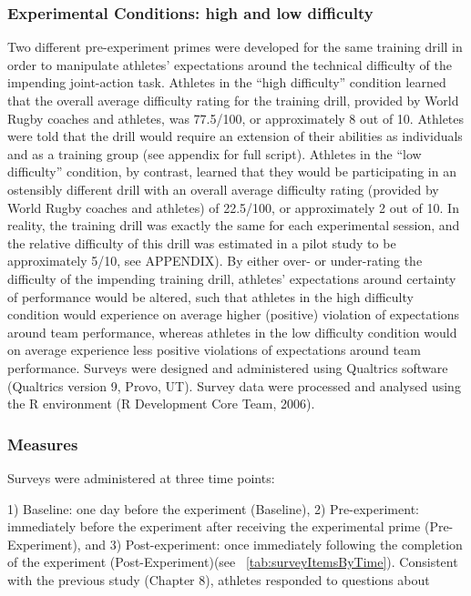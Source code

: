 \subsubsection{Experimental Conditions: high and low difficulty}
Two different pre-experiment primes were developed for the same training drill in order to manipulate athletes’ expectations around the technical difficulty of the impending joint-action task.  Athletes in the ``high difficulty'' condition learned that the overall average difficulty rating for the training drill, provided by World Rugby coaches and athletes, was 77.5/100, or approximately 8 out of 10.  Athletes were told that the drill would require an extension of their abilities as individuals and as a training group (see appendix for full script).  Athletes in the ``low difficulty'' condition, by contrast, learned that they would be participating in an ostensibly different drill with an overall average difficulty rating (provided by World Rugby coaches and athletes) of 22.5/100, or approximately 2 out of 10.  In reality, the training drill was exactly the same for each experimental session, and the relative difficulty of this drill was estimated in a pilot study to be approximately 5/10, see APPENDIX).  By either over- or under-rating the difficulty of the impending training drill, athletes' expectations around certainty of performance would be altered, such that athletes in the high difficulty condition would experience on average higher (positive) violation of expectations around team performance, whereas athletes in the low difficulty condition would on average experience less positive violations of expectations around team performance. Surveys were designed and administered using Qualtrics software (Qualtrics version 9, Provo, UT). Survey data were processed and analysed using the R environment (R Development Core Team, 2006).


\subsubsection{Measures}


    


Surveys were administered at three time points:

1) Baseline: one day before the experiment (Baseline),
2) Pre-experiment: immediately before the experiment after receiving the experimental prime (Pre-Experiment), and
3) Post-experiment: once immediately following the completion of the experiment (Post-Experiment)(see ~\ref{tab:surveyItemsByTime}).  Consistent with the previous study (Chapter 8), athletes responded to questions about

